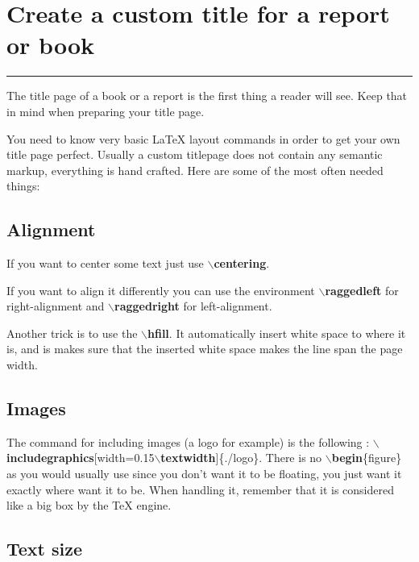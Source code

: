 \documentclass{report}
\begin{document}
    \section*{\huge Create a custom title for a report or book}
    \addtocounter{section}{1}
    \vspace{-10pt}\noindent\rule{\textwidth}{0.1pt}\vspace{10pt}

    The title page of a book or a report is the first thing a reader will see. Keep that in mind when preparing your title page.
    
    You need to know very basic LaTeX layout commands in order to get your own title page perfect. Usually a custom titlepage does not contain any semantic markup, everything is hand crafted. Here are some of the most often needed things:
    
        \subsection{Alignment}

            If you want to center some text just use \textbf{$\backslash$centering}.
            
            If you want to align it differently you can use the environment \textbf{$\backslash$raggedleft} for right-alignment and \textbf{$\backslash$raggedright} for left-alignment.

            Another trick is to use the \textbf{$\backslash$hfill}. It automatically insert white space to where it is, and is makes sure that the inserted white space makes the line span the page width.

        \subsection{Images}

            The command for including images (a logo for example) is the following : \textbf{$\backslash$includegraphics}[width=0.15\textbf{$\backslash$textwidth}]\{./logo\}. There is no \textbf{$\backslash$begin}\{figure\} as you would usually use since you don't want it to be floating, you just want it exactly where want it to be. When handling it, remember that it is considered like a big box by the \TeX{} engine.

        \subsection{Text size}
\end{document}
